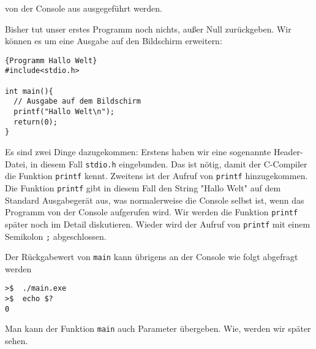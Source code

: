 \noindent von der Console aus ausgegeführt werden. 

Bisher tut unser erstes Programm noch nichts, außer Null zurückgeben. 
Wir können es um eine Ausgabe auf den Bildschirm erweitern:
\begin{lstlisting}{Programm Hallo Welt}
#include<stdio.h>

int main(){
  // Ausgabe auf dem Bildschirm
  printf("Hallo Welt\n");
  return(0);
}
\end{lstlisting}
Es sind zwei Dinge dazugekommen:
Erstens haben wir eine sogenannte Header-Datei, in diesem Fall \texttt{stdio.h} eingebunden.
Das ist nötig, damit der C-Compiler die Funktion \texttt{printf} kennt.
Zweitens ist der Aufruf von \texttt{printf} hinzugekommen.
Die Funktion \texttt{printf} gibt in diesem Fall den String "Hallo Welt" auf dem Standard Ausgabegerät aus, was normalerweise die Console selbst ist, wenn das Programm von der Console aufgerufen wird. 
Wir werden die Funktion \texttt{printf} später noch im Detail diskutieren.
Wieder wird der Aufruf von \texttt{printf} mit einem Semikolon \texttt{;} abgeschlossen.

Der Rückgabewert von \texttt{main} kann übrigens an der Console wie folgt abgefragt werden

\vspace*{0.5cm}
\begin{verbatim}
>$  ./main.exe
>$  echo $?
0
\end{verbatim}
\vspace*{0.5cm}

Man kann der Funktion \texttt{main} auch Parameter übergeben.
Wie, werden wir später sehen.
